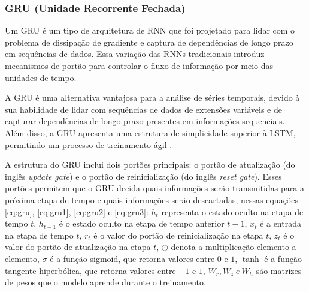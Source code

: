  \subsubsection{GRU (Unidade Recorrente Fechada)}
 
 
 Um GRU é um tipo de arquitetura de RNN que foi projetado para lidar com o problema de dissipação de gradiente e captura de dependências de longo prazo em sequências de dados. Essa variação das RNNs tradicionais introduz mecanismos de portão para controlar o fluxo de informação por meio das unidades de tempo.
 
 A GRU é uma alternativa vantajosa para a análise de séries temporais, devido à sua habilidade de lidar com sequências de dados de extensões variáveis e de capturar dependências de longo prazo presentes em informações sequenciais. Além disso, a GRU apresenta uma estrutura de simplicidade superior à LSTM, permitindo um processo de treinamento ágil  \cite{mastersthesis53fd58a7}.
 
 A estrutura do GRU inclui dois portões principais: o portão de atualização (do inglês \textit{update gate}) e o portão de reinicialização (do inglês \textit{reset gate}). Esses portões permitem que o GRU decida quais informações serão transmitidas para a próxima etapa de tempo e quais informações serão descartadas,
 nessas equações \eqref{eq:gru}, \eqref{eq:gru1}, \eqref{eq:gru2} e \eqref{eq:gru3}:
 \( h_t \) representa o estado oculto na etapa de tempo \( t \), \( h_{t-1} \) é o estado oculto na etapa de tempo anterior \( t-1 \), \( x_t \) é a entrada na etapa de tempo \( t \), \( r_t \) é o valor do portão de reinicialização na etapa \( t \), \( z_t \) é o valor do portão de atualização na etapa \( t \), \( \odot \) denota a multiplicação elemento a elemento, \( \sigma \) é a função sigmoid, que retorna valores entre $0$ e $1$, \( \tanh \) é a função tangente hiperbólica, que retorna valores entre $-1$ e $1$, \( W_r, W_z\ e\ W_h \) são matrizes de pesos que o modelo aprende durante o treinamento.
 

